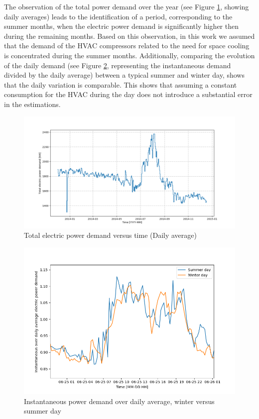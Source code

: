 \documentclass[preprint,12pt]{elsarticle}
\begin{document}
The observation of the total power demand over the year (see Figure \ref{fig:pelvstime}, showing daily averages) leads to the identification of a  period, corresponding to the summer months, when the electric power demand is significantly higher then during the remaining months. Based on this observation, in this work we assumed that the demand of the HVAC compressors related to the need for space cooling is concentrated during the summer months. Additionally, comparing the evolution of the daily demand (see Figure \ref{fig:pelrelvstime}, representing the instantaneous demand divided by the daily average) between a typical summer and winter day, shows that the daily variation is comparable. This shows that assuming a constant consumption for the HVAC during the day does not introduce a substantial error in the estimations.

\begin{figure}
	\centering
	\includegraphics[width=0.9\linewidth]{Figures/Pel_vs_time}
	\caption[Total electric power demand versus time (Daily average)]{Total electric power demand versus time (Daily average)}
	\label{fig:pelvstime}
\end{figure}

\begin{figure}
	\centering
	\includegraphics[width=0.9\linewidth]{Figures/PelRel_vs_time}
	\caption{Instantaneous power demand over daily average, winter versus summer day}
	\label{fig:pelrelvstime}
\end{figure}
\end{document}
